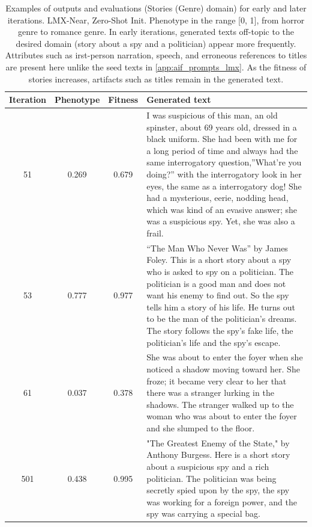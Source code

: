 \begin{table}[ht]
  \caption{Examples of outputs and evaluations (Stories (Genre) domain) for early and later iterations. LMX-Near, Zero-Shot Init. Phenotype in the range [0, 1], from horror genre to romance genre. In early iterations, generated texts off-topic to the desired domain (story about a spy and a politician) appear more frequently. Attributes such as irst-person narration, speech, and erroneous references to titles are present here unlike the seed texts in \ref{app:aif_prompts_lmx}. As the fitness of stories increases, artifacts such as titles remain in the generated text.}
  \begin{center}
  \small
  \begin{tabular}{cccp{8.5cm}}
    \toprule
    Iteration     & Phenotype  & Fitness     & Generated text \\
    \midrule
    51 &  0.269 & 0.679 &  I was suspicious of this man, an old spinster, about 69 years old, dressed in a black uniform. She had been with me for a long period of time and always had the same interrogatory question,\textquotedblright{}What're you doing?\textquotedblright{} with the interrogatory look in her eyes, the same as a interrogatory dog! She had a mysterious, eerie, nodding head, which was kind of an evasive answer; she was a suspicious spy. Yet, she was also a frail. \\
    \midrule
    53 & 0.777 & 0.977 &  \textquotedblleft{}The Man Who Never Was\textquotedblright{} by James Foley. This is a short story about a spy who is asked to spy on a politician. The politician is a good man and does not want his enemy to find out. So the spy tells him a story of his life. He turns out to be the man of the politician's dreams. The story follows the spy's fake life, the politician's life and the spy's escape. \\
    \midrule
    61 & 0.037 & 0.378 &  She was about to enter the foyer when she noticed a shadow moving toward her. She froze; it became very clear to her that there was a stranger lurking in the shadows. The stranger walked up to the woman who was about to enter the foyer and she slumped to the floor. \\
    \midrule
    \midrule
    501 &  0.438 & 0.995 & "The Greatest Enemy of the State," by Anthony Burgess. Here is a short story about a suspicious spy and a rich politician. The politician was being secretly spied upon by the spy, the spy was working for a foreign power, and the spy was carrying a special bag. \\

\end{tabular}
\end{center}
\end{table}
